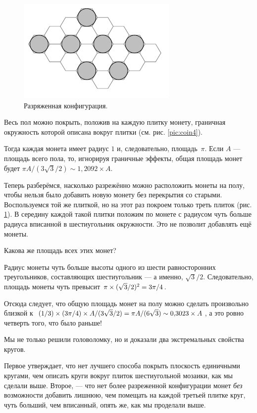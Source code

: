 \begin{figure}[b!]
\centering
\includegraphics[scale=1]{pics/coin5}
\caption{Разряженная конфигурация.}
\label{pic:coin5}
\end{figure}

Весь пол можно покрыть, положив на каждую плитку монету, граничная окружность которой описана вокруг плитки (см. рис. \ref{pic:coin4}).

Тогда каждая монета имеет радиус $1$ и, следовательно, площадь~$\pi$.
Если $A$ --- площадь всего пола, то, игнорируя граничные эффекты, общая площадь монет будет $\pi A/(3\sqrt{3}/2)\sim 1{,}2092\times A$.

Теперь разберёмся, насколько разрежённо можно расположить монеты на полу, чтобы нельзя было добавить новую монету без перекрытия со старыми.
Воспользуемся той же плиткой, но на этот раз покроем только треть плиток (рис. \ref{pic:coin5}).
В середину каждой такой плитки положим по монете с радиусом чуть больше радиуса вписанной в шестиугольник окружности. 
Это не позволит добавлять ещё монеты.

Какова же площадь всех этих монет?

Радиус монеты чуть больше высоты одного из шести равносторонних треугольников, составляющих шестиугольник — а именно, $\sqrt{3}/2$.
Следовательно, площадь монеты чуть превысит $\pi \z\times (\sqrt{3}/2)^2 \z= 3\pi/4$.

Отсюда следует, что общую площадь монет на полу можно сделать произвольно близкой к $(1/3) \times (3\pi/4) \times A/(3\sqrt{3}/2) = \pi A/(6 \sqrt{3}) \z\sim 0{,}3023 \times A$, а это ровно четверть того, что было раньше!

\medskip

Мы не только решили головоломку, но и доказали два экстремальных свойства кругов.

Первое утверждает, что нет лучшего способа покрыть плоскость единичными кругами, чем описать круги вокруг плиток шестиугольной мозаики, как мы сделали выше.
Второе, --- что нет более разреженной конфигурации монет \emph{без} возможности добавить лишнюю, чем помещать на каждой третьей плитке круг, чуть больший, чем вписанный, опять же, как мы проделали выше.

